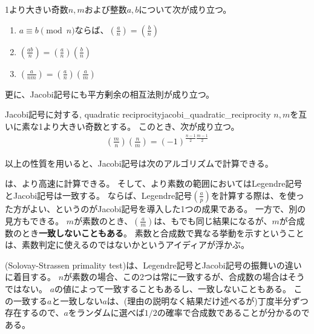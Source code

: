 \begin{Prop}{}{}
1より大きい奇数$n,m$および整数$a,b$について次が成り立つ。
\begin{enumerate}
\item $a\equiv b \pmod{n}$ならば、$\left(\frac{a}{n}\right)=\left(\frac{b}{n}\right)$
\item $\left(\frac{ab}{n}\right)=\left(\frac{a}{n}\right)\left(\frac{b}{n}\right)$
\item $\left(\frac{a}{nm}\right)=\left(\frac{a}{n}\right)\left(\frac{a}{m}\right)$
\end{enumerate}
\end{Prop}

更に、Jacobi記号にも平方剰余の相互法則が成り立つ。

\begin{Theo}{Jacobi記号に対する, quadratic reciprocity}{jacobi_quadratic_reciprocity}
$n,m$を互いに素な1より大きい奇数とする。
このとき、次が成り立つ。
\begin{align*}
\left(\frac{m}{n}\right)\left(\frac{n}{m}\right) = (-1)^{\frac{n-1}{2}\frac{m-1}{2}}
\end{align*}
\end{Theo}

以上の性質を用いると、Jacobi記号は次のアルゴリズムで計算できる。


は、より高速に計算できる。
そして、より素数の範囲においてはLegendre記号とJacobi記号は一致する。
ならば、Legendre記号$\left(\frac{a}{p}\right)$を計算する際は、を使った方がよい、というのがJacobi記号を導入した1つの成果である。
一方で、別の見方もできる。
$m$が素数のとき、$\left(\frac{a}{m}\right)$は、もでも同じ結果になるが、$m$が合成数のとき\textbf{一致しないこともある}。
素数と合成数で異なる挙動を示すということは、素数判定に使えるのではないかというアイディアが浮かぶ。

(Solovay-Strassen primality test)は、Legendre記号とJacobi記号の振舞いの違いに着目する\cite{DBLP:journals/siamcomp/SolovayS77}。
$n$が素数の場合、この2つは常に一致するが、合成数の場合はそうではない。
$a$の値によって一致することもあるし、一致しないこともある。
この一致する$a$と一致しない$a$は、(理由の説明なく結果だけ述べるが)丁度半分ずつ存在するので、$a$をランダムに選べば$1/2$の確率で合成数であることが分かるのである。



